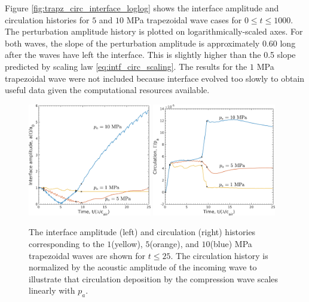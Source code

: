 Figure \ref{fig:trapz_circ_interface_loglog} shows the interface
amplitude and circulation histories for $5$ and $10$ MPa trapezoidal
wave cases for $0 \leq t\leq 1000$. The perturbation amplitude history
is plotted on logarithmically-scaled axes. For both waves, the slope
of the perturbation amplitude is approximately $0.60$ long after the
waves have left the interface. This is slightly higher than the 0.5
slope predicted by scaling law \eqref{eq:intf_circ_scaling}. The
results for the $1$ MPa trapezoidal wave were not included because
interface evolved too slowly to obtain useful data given the
computational resources available.
%
\begin{figure}[h] 
  \centering
  \includegraphics[width=0.48\textwidth]{./figs/lung_figs/interface_multi-amp_norm}
  \includegraphics[width=0.48\textwidth]{./figs/lung_figs/circulation_multi-amp_norm}
  \caption[The interface and circulation dependence on wave amplitude at early time]{The interface amplitude (left) and circulation (right)
    histories corresponding to the $1$(yellow), $5$(orange), and
    $10$(blue) MPa trapezoidal waves are shown for $t\leq 25$. The
    circulation history is normalized by the acoustic amplitude of the
    incoming wave to illustrate that circulation deposition by the
    compression wave scales linearly with $p_a$.}
  \label{fig:trapz_circ_interface_early}
\end{figure}
%
